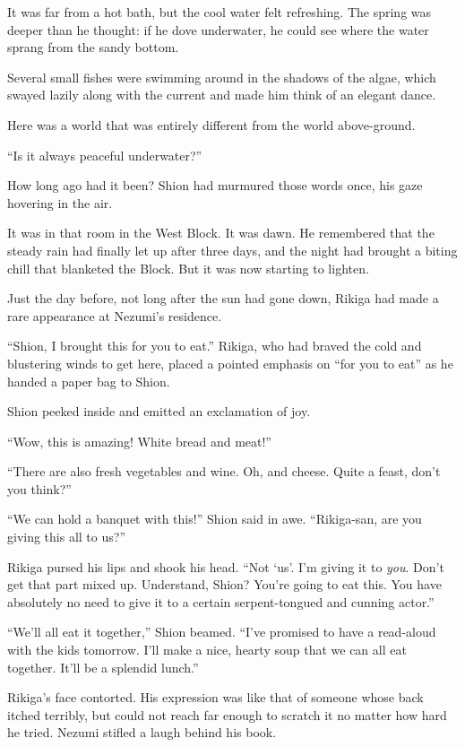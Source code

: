 It was far from a hot bath, but the cool water felt refreshing. The
spring was deeper than he thought: if he dove underwater, he could see
where the water sprang from the sandy bottom.

Several small fishes were swimming around in the shadows of the algae,
which swayed lazily along with the current and made him think of an
elegant dance.~

Here was a world that was entirely different from the world
above-ground.

``Is it always peaceful underwater?''

How long ago had it been? Shion had murmured those words once, his gaze
hovering in the air.

\myspace

It was in that room in the West Block. It was dawn. He remembered that
the steady rain had finally let up after three days, and the night had
brought a biting chill that blanketed the Block. But it was now starting
to lighten.

Just the day before, not long after the sun had gone down, Rikiga had
made a rare appearance at Nezumi's residence.

``Shion, I brought this for you to eat.'' Rikiga, who had braved the
cold and blustering winds to get here, placed a pointed emphasis on
``for you to eat'' as he handed a paper bag to Shion.

Shion peeked inside and emitted an exclamation of joy.

``Wow, this is amazing! White bread and meat!''

``There are also fresh vegetables and wine. Oh, and cheese. Quite a
feast, don't you think?''

``We can hold a banquet with this!'' Shion said in awe. ``Rikiga-san,
are you giving this all to us?''

Rikiga pursed his lips and shook his head. ``Not `us'. I'm giving it to
\emph{you}. Don't get that part mixed up. Understand, Shion? You're going to
eat this. You have absolutely no need to give it to a certain
serpent-tongued and cunning actor.''

``We'll all eat it together,'' Shion beamed. ``I've promised to have a
read-aloud with the kids tomorrow. I'll make a nice, hearty soup that we
can all eat together. It'll be a splendid lunch.''

Rikiga's face contorted. His expression was like that of someone whose
back itched terribly, but could not reach far enough to scratch it no
matter how hard he tried. Nezumi stifled a laugh behind his book.

